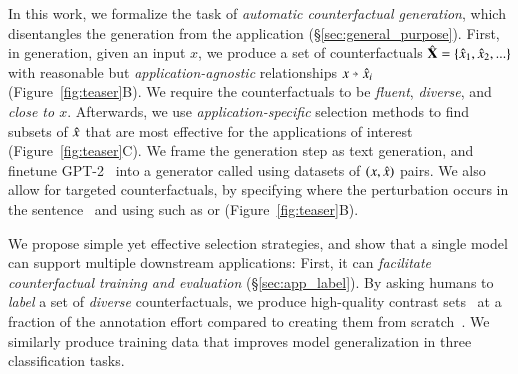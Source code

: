 In this work, we formalize the task of \emph{automatic counterfactual generation}, which disentangles the generation from the application (\S\ref{sec:general_purpose}).
First, in generation, given an input $x$, we produce a set of counterfactuals $\hat{\mathbf{X}} = \{\hat{x}_1, \hat{x}_2, ...\}$ with reasonable but \emph{application-agnostic} relationships $x \veryshortarrow \xp_i$ (Figure~\ref{fig:teaser}B).
We require the counterfactuals to be \emph{fluent}, \emph{diverse}, and \emph{close to $x$}.
Afterwards, we use \emph{application-specific} selection methods to find subsets of $\hat{x}$ that are most effective for the applications of interest (Figure~\ref{fig:teaser}C).
We frame the generation step as text generation, and finetune GPT-2~\cite{radford2019language} into a generator called \emph{\sysname} using datasets of $(x, \hat{x})$ pairs. 
We also allow for targeted counterfactuals, by specifying where the perturbation occurs in the sentence~\cite{donahue2020enabling} and using \tagstrs such as  or  (Figure~\ref{fig:teaser}B). 

We propose simple yet effective selection strategies, and show that a single \sysname model can support multiple downstream applications:
First, it can \emph{facilitate counterfactual training and evaluation} (\S\ref{sec:app_label}). 
By asking humans to \emph{label} a set of \emph{diverse} counterfactuals, we produce high-quality contrast sets~\cite{gardner2020contrast} at a fraction of the annotation effort compared to creating them from scratch~\cite{kaushik2019learning}.
We similarly produce training data that improves model generalization in three classification tasks. %

